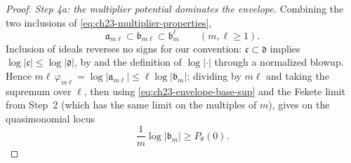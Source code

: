 \begin{proof}
\emph{Step 4a: the multiplier potential dominates the envelope.}
Combining the two inclusions of \eqref{eq:ch23-multiplier-properties},
\[
       \mathfrak a_{m\ell}
       \subset\mathfrak b_{m\ell}
       \subset\mathfrak b_m^\ell
       \qquad(m,\ell\geq1).
\]
Inclusion of ideals reverses no signs for our convention:
$\mathfrak c\subset\mathfrak d$ implies
$\log|\mathfrak c|\leq\log|\mathfrak d|$, by
 and the definition of
$\log|\cdot|$ through a normalized blowup.  Hence
$m\ell\,\varphi_{m\ell}=\log|\mathfrak a_{m\ell}|\leq
\ell\log|\mathfrak b_m|$; dividing by $m\ell$ and taking the supremum
over $\ell$, then using \eqref{eq:ch23-envelope-base-sup} and the Fekete
limit from Step~2 (which has the same limit on the multiples of $m$), gives on the
quasimonomial locus
\begin{equation}\label{eq:ch23-multiplier-upper-control}
              \frac1m\log|\mathfrak b_m|
              \geq P_\theta(0).
\end{equation}


\end{proof}
